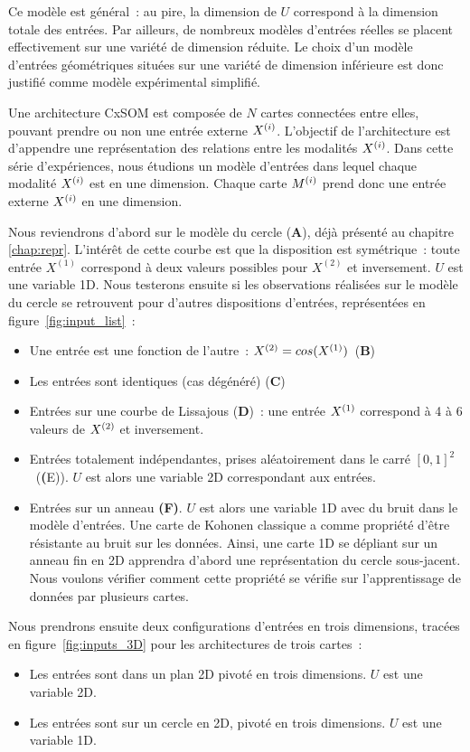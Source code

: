 \documentclass[../main]{subfiles}
\begin{document}
Ce modèle est général~: au pire, la dimension de $U$ correspond à la dimension totale des entrées. 
Par ailleurs, de nombreux modèles d'entrées réelles se placent effectivement sur une variété de dimension réduite. Le choix d'un modèle d'entrées géométriques situées sur une variété de dimension inférieure est donc justifié comme modèle expérimental simplifié.

Une architecture CxSOM est composée de $N$ cartes connectées entre elles, pouvant prendre ou non une entrée externe $X^{({i})}$. L'objectif de l'architecture est d'appendre une représentation des relations entre les modalités $X^{({i})}$.
Dans cette série d'expériences, nous étudions un modèle d'entrées dans lequel chaque modalité $X^{({i})}$ est en une dimension. Chaque carte $M^{({i})}$ prend donc une entrée externe $X^{({i})}$ en une dimension.

Nous reviendrons d'abord sur le modèle du cercle (\textbf{A}), déjà présenté au chapitre \ref{chap:repr}. L'intérêt de cette courbe est que la disposition est symétrique~: toute entrée $X^{(1)}$ correspond à deux valeurs possibles pour $X^{(2)}$ et inversement. $U$ est une variable 1D.
Nous testerons ensuite si les observations réalisées sur le modèle du cercle se retrouvent pour d'autres dispositions d'entrées, représentées en figure~\ref{fig:input_list}~:
\begin{itemize}
	\item Une entrée est une fonction de l'autre~: $X^{({2})} = cos(X^{({1})})$~(\textbf{B})
	\item Les entrées sont identiques (cas dégénéré) (\textbf{C})
	\item Entrées sur une courbe de Lissajous (\textbf{D})~: une entrée $X^{({1})}$ correspond à 4 à 6 valeurs de $X^{({2})}$ et inversement.
	\item Entrées totalement indépendantes, prises aléatoirement dans le carré $[0,1]^2$~(\textbf({E})). $U$ est alors une variable 2D correspondant aux entrées.
	\item Entrées sur un anneau \textbf{(F)}. $U$ est alors une variable 1D avec du bruit dans le modèle d'entrées. Une carte de Kohonen classique a comme propriété d'être résistante au bruit sur les données. Ainsi, une carte 1D se dépliant sur un anneau fin en 2D apprendra d'abord une représentation du cercle sous-jacent. Nous voulons vérifier comment cette propriété se vérifie sur l'apprentissage de données par plusieurs cartes.
\end{itemize}

Nous prendrons ensuite deux configurations d'entrées en trois dimensions, tracées en figure~\ref{fig:inputs_3D} pour les architectures de trois cartes~:
\begin{itemize}
	\item Les entrées sont dans un plan 2D pivoté en trois dimensions. $U$ est une variable 2D.
	\item Les entrées sont sur un cercle en 2D, pivoté en trois dimensions. $U$ est une variable 1D.
\end{itemize}
\end{document}
